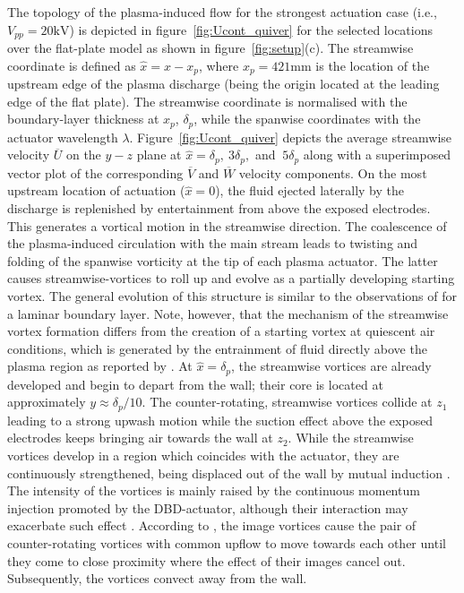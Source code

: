 The topology of the plasma-induced flow for the strongest actuation case (i.e., $V_{pp} = 20\mathrm{kV}$) is depicted in figure~\ref{fig:Ucont_quiver} for the selected locations over the flat-plate model as shown in figure~\ref{fig:setup}(c). The streamwise coordinate is defined as $\hat{x}=x-x_p$, where $x_p = 421\mathrm{mm}$ is the location of the upstream edge of the plasma discharge (being the origin located at the leading edge of the flat plate). The streamwise coordinate is normalised with the boundary-layer thickness at $x_p$, $\delta_p$, while the spanwise coordinates with the actuator wavelength $\lambda$. Figure~\ref{fig:Ucont_quiver} depicts the average streamwise velocity $\overline{U}$ on the $y-z$ plane at $\hat{x} = \delta_p,~3\delta_p,$ and $~5\delta_p$ along with a superimposed vector plot of the corresponding $\overline{V}$ and $\overline{W}$ velocity components. On the most upstream location of actuation ($\hat{x} = 0$), the fluid ejected laterally by the discharge is replenished by entertainment from above the exposed electrodes. This generates a vortical motion in the streamwise direction. The coalescence of the plasma-induced circulation with the main stream leads to twisting and folding of the spanwise vorticity at the tip of each plasma actuator. The latter causes streamwise-vortices to roll up and evolve as a partially developing starting vortex. The general evolution of this structure is similar to the observations of \citet{jukes2013plasmaVG} for a laminar boundary layer. Note, however, that the mechanism of the streamwise vortex formation differs from the creation of a starting vortex at quiescent air conditions, which is generated by the entrainment of fluid directly above the plasma region as reported by \citet{Whalley2010DBDvortex,Whalley2012startingV}. At $\hat{x} = \delta_p$, the streamwise vortices are already developed and begin to depart from the wall; their core is located at approximately $y\approx \delta_p/10$. The counter-rotating, streamwise vortices collide at $z_1$ leading to a strong upwash motion while the suction effect above the exposed electrodes keeps bringing air towards the wall at $z_2$. While the streamwise vortices develop in a region which coincides with the actuator, they are continuously strengthened, being displaced out of the wall by mutual induction \citep{Jukes2012}. The intensity of the vortices is mainly raised by the continuous momentum injection promoted by the DBD-actuator, although their interaction may exacerbate such effect \citep{Logdberg2009}. According to \citet{Pauley1988,Pauley1994}, the image vortices \citep{Ersoy1985} cause the pair of counter-rotating vortices with common upflow to move towards each other until they come to close proximity where the effect of their images cancel out. Subsequently, the vortices convect away from the wall.

